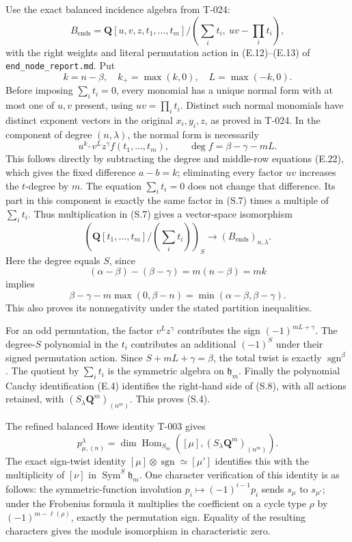 \documentclass[
  10pt,
]{article}
\begin{document}
Use the exact balanced incidence algebra from T-024: \[
B_{\mathrm{ends}}
=\mathbf Q[u,v,z,t_1,\ldots,t_m]
/(\sum_i t_i,\ uv-\prod_i t_i),
\tag{S.6}
\] with the right weights and literal permutation action in
(E.12)--(E.13) of
\texttt{\small end\_\allowbreak{}node\_\allowbreak{}report.md}. Put \[
k=n-\beta,\quad k_+=\max(k,0),\quad L=\max(-k,0).
\] Before imposing \(\sum_i t_i=0\), every monomial has a unique normal
form with at most one of \(u,v\) present, using \(uv=\prod_i t_i\).
Distinct such normal monomials have distinct exponent vectors in the
original \(x_i,y_i,z\), as proved in T-024. In the component of degree
\((n,\lambda)\), the normal form is necessarily \[
u^{k_+}v^L z^\gamma f(t_1,\ldots,t_m),
\qquad \deg f=\beta-\gamma-mL.
\tag{S.7}
\] This follows directly by subtracting the degree and middle-row
equations (E.22), which gives the fixed difference \(a-b=k\);
eliminating every factor \(uv\) increases the \(t\)-degree by \(m\). The
equation \(\sum_i t_i=0\) does not change that difference. Its part in
this component is exactly the same factor in (S.7) times a multiple of
\(\sum_i t_i\). Thus multiplication in (S.7) gives a vector-space
isomorphism \[
\left(\mathbf Q[t_1,\ldots,t_m]/(\sum_i t_i)\right)_S
\longrightarrow (B_{\mathrm{ends}})_{n,\lambda}.
\tag{S.8}
\] Here the degree equals \(S\), since \[
(\alpha-\beta)-(\beta-\gamma)=m(n-\beta)=mk
\] implies \[
\beta-\gamma-m\max(0,\beta-n)
=\min(\alpha-\beta,\beta-\gamma).
\tag{S.9}
\] This also proves its nonnegativity under the stated partition
inequalities.

For an odd permutation, the factor \(v^Lz^\gamma\) contributes the sign
\((-1)^{mL+\gamma}\). The degree-\(S\) polynomial in the \(t_i\)
contributes an additional \((-1)^S\) under their signed permutation
action. Since \(S+mL+\gamma=\beta\), the total twist is exactly
\(\operatorname{sgn}^{\beta}\). The quotient by \(\sum_i t_i\) is the
symmetric algebra on \(\mathfrak h_m\). Finally the polynomial Cauchy
identification (E.4) identifies the right-hand side of (S.8), with all
actions retained, with \((S_\lambda\mathbf Q^m)_{(n^m)}\). This proves
(S.4).

The refined balanced Howe identity T-003 gives \[
p_{\mu,(n)}^\lambda
=\dim\operatorname{Hom}_{S_m}([\mu],(S_\lambda\mathbf Q^m)_{(n^m)}).
\tag{S.10}
\] The exact sign-twist identity
\([\mu]\otimes\operatorname{sgn}\simeq[\mu']\) identifies this with the
multiplicity of \([\nu]\) in \(\operatorname{Sym}^{S}\mathfrak h_m\).
One character verification of this identity is as follows: the
symmetric-function involution \(p_i\mapsto(-1)^{i-1}p_i\) sends
\(s_\mu\) to \(s_{\mu'}\); under the Frobenius formula it multiplies the
coefficient on a cycle type \(\rho\) by \((-1)^{m-\ell(\rho)}\), exactly
the permutation sign. Equality of the resulting characters gives the
module isomorphism in characteristic zero.
\end{document}
